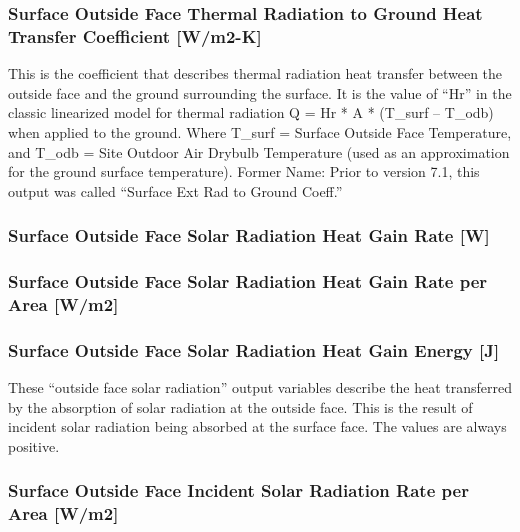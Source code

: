 \subsubsection{Surface Outside Face Thermal Radiation to Ground Heat Transfer Coefficient {[}W/m2-K{]}}\label{surface-outside-face-thermal-radiation-to-ground-heat-transfer-coefficient-wm2-k}

This is the coefficient that describes thermal radiation heat transfer between the outside face and the ground surrounding the surface. It is the value of ``Hr'' in the classic linearized model for thermal radiation Q = Hr * A * (T\_surf -- T\_odb) when applied to the ground. Where T\_surf = Surface Outside Face Temperature, and T\_odb = Site Outdoor Air Drybulb Temperature (used as an approximation for the ground surface temperature). Former Name: Prior to version 7.1, this output was called ``Surface Ext Rad to Ground Coeff.''

\subsubsection{Surface Outside Face Solar Radiation Heat Gain Rate {[}W{]}}\label{surface-outside-face-solar-radiation-heat-gain-rate-w}

\subsubsection{Surface Outside Face Solar Radiation Heat Gain Rate per Area {[}W/m2{]}}\label{surface-outside-face-solar-radiation-heat-gain-rate-per-area-wm2}

\subsubsection{Surface Outside Face Solar Radiation Heat Gain Energy {[}J{]}}\label{surface-outside-face-solar-radiation-heat-gain-energy-j}

These ``outside face solar radiation'' output variables describe the heat transferred by the absorption of solar radiation at the outside face. This is the result of incident solar radiation being absorbed at the surface face. The values are always positive.

\subsubsection{Surface Outside Face Incident Solar Radiation Rate per Area {[}W/m2{]}}\label{surface-outside-face-incident-solar-radiation-rate-per-area-wm2}


